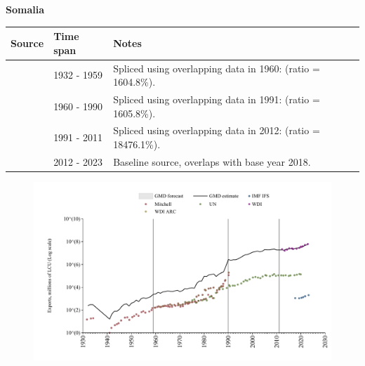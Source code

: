 \documentclass[12pt,a4paper,landscape]{article}
\begin{document}
\begin{adjustbox}{max totalsize={\paperwidth}{\paperheight},center}
\begin{minipage}[t][\textheight][t]{\textwidth}
\vspace*{0.5cm}
{}
\begin{center}
{\Large\bfseries Somalia}
\end{center}
\vspace{0.5cm}
\begin{table}[H]
\centering
\small
\begin{tabular}{|l|l|l|}
\hline
\textbf{Source} & \textbf{Time span} & \textbf{Notes} \\
\hline
\rowcolor{white}\cite{Mitchell}& 1932 - 1959 &Spliced using overlapping data in 1960: (ratio = 1604.8\%).\\
\rowcolor{lightgray}\cite{WDI}& 1960 - 1990 &Spliced using overlapping data in 1991: (ratio = 1605.8\%).\\
\rowcolor{white}\cite{UN}& 1991 - 2011 &Spliced using overlapping data in 2012: (ratio = 18476.1\%).\\
\rowcolor{lightgray}\cite{WDI}& 2012 - 2023 &Baseline source, overlaps with base year 2018.\\
\hline
\end{tabular}
\end{table}
\begin{figure}[H]
\centering
\includegraphics[width=\textwidth,height=0.6\textheight,keepaspectratio]{graphs/SOM_exports.pdf}
\end{figure}
\end{minipage}
\end{adjustbox}
\end{document}
